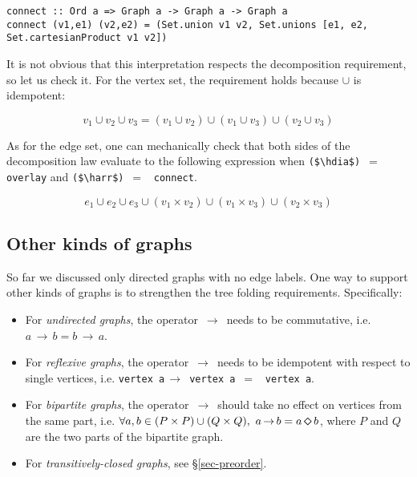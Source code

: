 \documentclass[english,submission]{programming}
\newcommand{\code}[1]{\lstinline[mathescape]|#1|}
\newcommand{\hcode}[1]{{\color{darkblue} \lstinline[keywordstyle={}]|#1|}} %
\newcommand{\hdia}{\,\text{\raisebox{-0.2mm}{\Large\color{darkblue} $\diamond$}}\,}
\newcommand{\harr}{\,\text{\color{darkblue} $\rightarrow$}\,}
\newcommand{\dia}{\,\text{\raisebox{-0.3mm}{\Large $\diamond$}}\,}
\newcommand{\arr}{\,\text{$\rightarrow$}\,}
\begin{document}
\begin{lstlisting}
connect :: Ord a => Graph a -> Graph a -> Graph a
connect (v1,e1) (v2,e2) = (Set.union v1 v2, Set.unions [e1, e2, Set.cartesianProduct v1 v2])
\end{lstlisting}

\noindent
It is not obvious that this interpretation respects the decomposition
requirement, so let us check it. For the vertex set, the requirement holds
because $\cup$ is idempotent:

\vspace{-5mm}
\begin{equation*}
v_1 \cup v_2 \cup v_3 = (v_1 \cup v_2) \cup (v_1 \cup v_3) \cup (v_2 \cup v_3)
\end{equation*}
\vspace{-5mm}

\noindent
As for the edge set, one can mechanically check that both sides of the
decomposition law evaluate to the following expression when
\code{($\hdia$)}~$=$~\hcode{overlay} and \code{($\harr$)}~$=$~\hcode{connect}.

\vspace{-5mm}
\begin{equation*}
e_1 \cup e_2 \cup e_3 \cup (v_1 \times v_2) \cup (v_1 \times v_3) \cup (v_2 \times v_3)
\end{equation*}
\vspace{-5mm}

\subsection{Other kinds of graphs}

So far we discussed only directed graphs with no edge labels. One way to support
other kinds of graphs is to strengthen the tree folding requirements.
Specifically:

\begin{itemize}
    \item For \emph{undirected graphs}, the operator $\arr$ needs to be
    commutative, i.e. $a \arr b = b \arr a$.
    \item For \emph{reflexive graphs}, the operator $\arr$ needs to be
    idempotent with respect to single vertices, i.e.
    \hcode{vertex a}$\arr$\hcode{vertex a}~$=$~\hcode{vertex a}.
    \item For \emph{bipartite graphs}, the operator $\arr$ should take no
    effect on vertices from the same part, i.e.
    $\forall a,b \in (P \times P) \cup (Q \times Q),\ a \arr b = a \dia b$,
    where $P$ and $Q$ are the two parts of the bipartite graph.
    \item For \emph{transitively-closed graphs}, see \S\ref{sec-preorder}.
\end{itemize}
\end{document}
